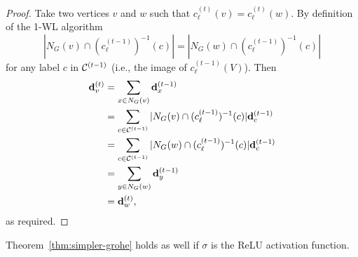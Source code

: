 \begin{proof}
Take two vertices $v$ and $w$ such that $c_\ell^{(t)}(v)=c_\ell^{(t)}(w)$. By definition of the 1-WL algorithm 
$$
|N_G(v)\cap (c_\ell^{(t-1)})^{-1}(c)|=|N_G(w)\cap (c_\ell^{(t-1)})^{-1}(c)|
$$
for any label $c$ in ${\cal C}^{(t-1)}$ (i.e., the image of $c_\ell^{(t-1)}(V)$). Then
\begin{align*}
\mathbf{d}^{(t)}_v&=\sum_{x\in N_G(v)} \mathbf{d}^{(t-1)}_{x}\\
&=\sum_{c\in{\cal C}^{(t-1)}} |N_G(v)\cap (c_\ell^{(t-1)})^{-1}(c)|\mathbf{d}^{(t-1)}_{c}\\
&=\sum_{c\in{\cal C}^{(t-1)}} |N_G(w)\cap (c_\ell^{(t-1)})^{-1}(c)|\mathbf{d}^{(t-1)}_{c}\\
&=\sum_{y\in N_G(w)} \mathbf{d}^{(t-1)}_{y}\\
&=\mathbf{d}^{(t)}_w,
\end{align*}
as required.
\end{proof}

\begin{theorem}\label{thm:denorm-kipf}
    Theorem~\ref{thm:simpler-grohe} holds as well 
    if $\sigma$ is the ReLU
    activation function.
\end{theorem}


